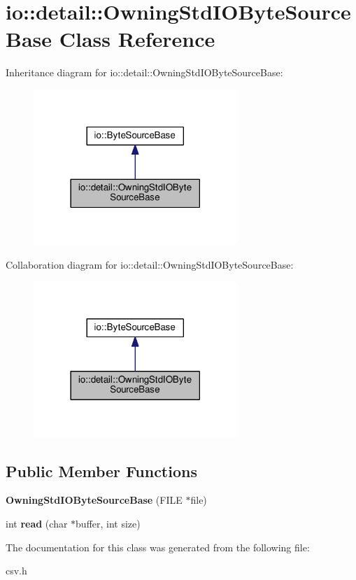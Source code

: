 \section{io\+:\+:detail\+:\+:Owning\+Std\+I\+O\+Byte\+Source\+Base Class Reference}
\label{classio_1_1detail_1_1_owning_std_i_o_byte_source_base}


Inheritance diagram for io\+:\+:detail\+:\+:Owning\+Std\+I\+O\+Byte\+Source\+Base\+:\nopagebreak
\begin{figure}[H]
\begin{center}
\leavevmode
\includegraphics[width=218pt]{classio_1_1detail_1_1_owning_std_i_o_byte_source_base__inherit__graph}
\end{center}
\end{figure}


Collaboration diagram for io\+:\+:detail\+:\+:Owning\+Std\+I\+O\+Byte\+Source\+Base\+:\nopagebreak
\begin{figure}[H]
\begin{center}
\leavevmode
\includegraphics[width=218pt]{classio_1_1detail_1_1_owning_std_i_o_byte_source_base__coll__graph}
\end{center}
\end{figure}
\subsection*{Public Member Functions}
\begin{DoxyCompactItemize}
\item 
{\bfseries Owning\+Std\+I\+O\+Byte\+Source\+Base} (F\+I\+LE $\ast$file)\label{classio_1_1detail_1_1_owning_std_i_o_byte_source_base_a259f77d1a3c57720b54b88d9f8a3c018}

\item 
int {\bfseries read} (char $\ast$buffer, int size)\label{classio_1_1detail_1_1_owning_std_i_o_byte_source_base_a9269e7bfd07ebf2fa3518912fe7bebd0}

\end{DoxyCompactItemize}


The documentation for this class was generated from the following file\+:\begin{DoxyCompactItemize}
\item 
csv.\+h\end{DoxyCompactItemize}
